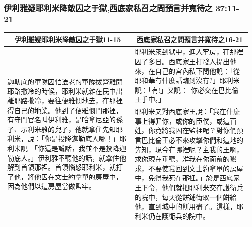 \subsubsection{伊利雅疑耶利米降敵囚之于獄,西底家私召之問預言并寬待之 37:11-21}
\begin{table}[H]
\centering
\begin{tabular}{p{}|p{10.0cm}}\hline\hline
\multicolumn{1}{c|}{伊利雅疑耶利米降敵囚之于獄11-15}&\multicolumn{1}{c}{西底家私召之問預言并寬待之16-21}\\\hline
\multirow{2}{7.25cm}{迦勒底的軍隊因怕法老的軍隊拔營離開耶路撒冷的時候，耶利米就雜在民中出離耶路撒冷，要往便雅憫地去，在那裡得自己的地業。他到了便雅憫門那裡，有守門官名叫伊利雅，是哈拿尼亞的孫子、示利米雅的兒子，他就拿住先知耶利米，說：「你是投降迦勒底人哪！」耶利米說：「你這是謊話，我並不是投降迦勒底人。」伊利雅不聽他的話，就拿住他解到首領那裡。首領惱怒耶利米，就打了他，將他囚在文士約拿單的房屋中，因為他們以這房屋當做監牢。}&耶利米來到獄中，進入牢房，在那裡囚了多日。西底家王打發人提出他來，在自己的宮內私下問他說：「從耶和華有什麼話臨到沒有?」耶利米說：「有!」又說：「你必交在巴比倫王手中。」\\\cline{2-2}
&耶利米又對西底家王說：「我在什麼事上得罪你，或你的臣僕，或這百姓，你竟將我囚在監裡呢？對你們預言巴比倫王必不來攻擊你們和這地的先知，現今在哪裡呢？主我的王啊，求你現在垂聽，准我在你面前的懇求，不要使我回到文士約拿單的房屋中，免得我死在那裡。」於是西底家王下令，他們就把耶利米交在護衛兵的院中，每天從餅鋪街取一個餅給他，直到城中的餅用盡了。這樣，耶利米仍在護衛兵的院中。\\\hline
\end{tabular}
\end{table}
 
